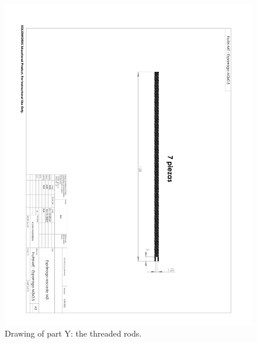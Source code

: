 \begin{figure}
\begin{center}
\includegraphics[angle=180,width=0.9\linewidth]{figures/huitzi-f20-part-Y.pdf}
\end{center}
\caption{Drawing of part Y: the threaded rods.}
\label{figure:huitzi-f20-part-Y}
\end{figure}

